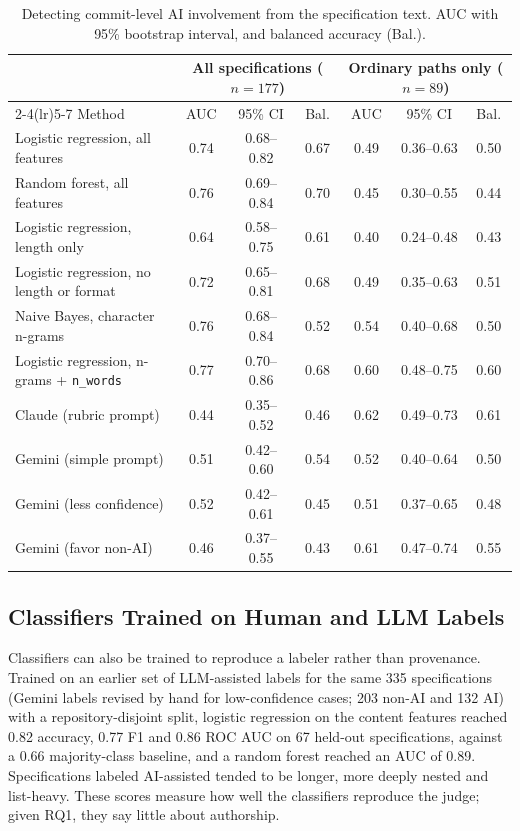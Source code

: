 \documentclass{article}
\begin{document}
\begin{table}[ht]
\centering
\small
\caption{Detecting commit-level AI involvement from the specification text. AUC with 95\% bootstrap interval, and balanced accuracy (Bal.).}
\label{tab:provenance-cv}
\begin{tabular}{lcccccc}
\toprule
& \multicolumn{3}{c}{All specifications ($n=177$)} & \multicolumn{3}{c}{Ordinary paths only ($n=89$)} \\
\cmidrule(lr){2-4}\cmidrule(lr){5-7}
Method & AUC & 95\% CI & Bal. & AUC & 95\% CI & Bal. \\
\midrule
Logistic regression, all features & 0.74 & 0.68--0.82 & 0.67 & 0.49 & 0.36--0.63 & 0.50 \\
Random forest, all features & 0.76 & 0.69--0.84 & 0.70 & 0.45 & 0.30--0.55 & 0.44 \\
Logistic regression, length only & 0.64 & 0.58--0.75 & 0.61 & 0.40 & 0.24--0.48 & 0.43 \\
Logistic regression, no length or format & 0.72 & 0.65--0.81 & 0.68 & 0.49 & 0.35--0.63 & 0.51 \\
Naive Bayes, character n-grams & 0.76 & 0.68--0.84 & 0.52 & 0.54 & 0.40--0.68 & 0.50 \\
Logistic regression, n-grams + \texttt{n\_words} & 0.77 & 0.70--0.86 & 0.68 & 0.60 & 0.48--0.75 & 0.60 \\
\midrule
Claude (rubric prompt) & 0.44 & 0.35--0.52 & 0.46 & 0.62 & 0.49--0.73 & 0.61 \\
Gemini (simple prompt) & 0.51 & 0.42--0.60 & 0.54 & 0.52 & 0.40--0.64 & 0.50 \\
Gemini (less confidence) & 0.52 & 0.42--0.61 & 0.45 & 0.51 & 0.37--0.65 & 0.48 \\
Gemini (favor non-AI) & 0.46 & 0.37--0.55 & 0.43 & 0.61 & 0.47--0.74 & 0.55 \\
\bottomrule
\end{tabular}
\end{table}

\subsection{Classifiers Trained on Human and LLM Labels}
Classifiers can also be trained to reproduce a labeler rather than provenance. Trained on an earlier set of LLM-assisted labels for the same 335 specifications (Gemini labels revised by hand for low-confidence cases; 203 non-AI and 132 AI) with a repository-disjoint split, logistic regression on the content features reached 0.82 accuracy, 0.77 F1 and 0.86 ROC AUC on 67 held-out specifications, against a 0.66 majority-class baseline, and a random forest reached an AUC of 0.89. Specifications labeled AI-assisted tended to be longer, more deeply nested and list-heavy. These scores measure how well the classifiers reproduce the judge; given RQ1, they say little about authorship.
\end{document}
